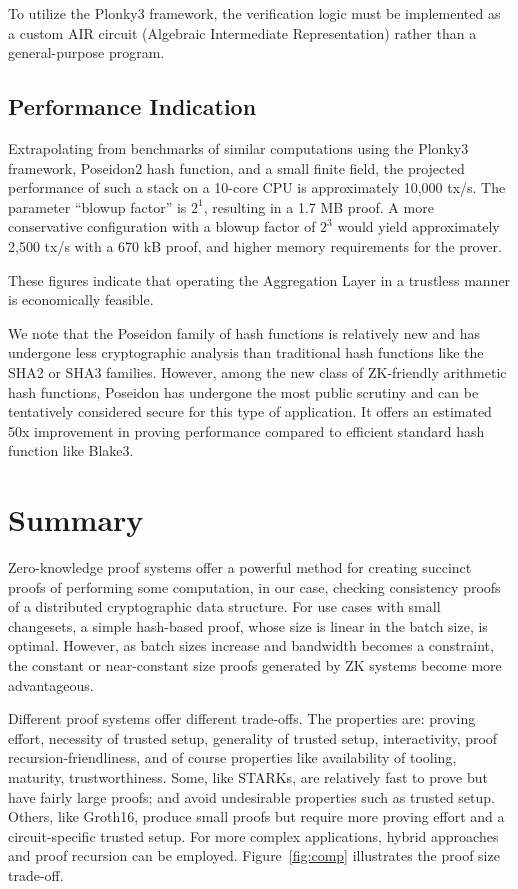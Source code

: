 \documentclass[twocolumn]{article}
\begin{document}
To utilize the Plonky3 framework, the verification logic must be implemented as a custom AIR circuit (Algebraic Intermediate Representation) rather than a general-purpose program.

\subsection{Performance Indication}

Extrapolating from benchmarks of similar computations using the Plonky3 framework, Poseidon2 hash function, and a small finite field, the projected performance of such a stack on a 10-core CPU is approximately 10,000 tx/s. The parameter ``blowup factor'' is $2^1$, resulting in a 1.7 MB proof. A more conservative configuration with a blowup factor of $2^3$ would yield approximately 2,500 tx/s with a 670 kB proof, and higher memory requirements for the prover.

These figures indicate that operating the Aggregation Layer in a trustless manner is economically feasible.

We note that the Poseidon family of hash functions is relatively new and has undergone less cryptographic analysis than traditional hash functions like the SHA2 or SHA3 families. However, among the new class of ZK-friendly arithmetic hash functions, Poseidon has undergone the most public scrutiny and can be tentatively considered secure for this type of application. It offers an estimated 50x improvement in proving performance compared to efficient standard hash function like Blake3.

\section{Summary}

Zero-knowledge proof systems offer a powerful method for creating succinct proofs of performing some computation, in our case, checking consistency proofs of a distributed cryptographic data structure. For use cases with small changesets, a simple hash-based proof, whose size is linear in the batch size, is optimal. However, as batch sizes increase and bandwidth becomes a constraint, the constant or near-constant size proofs generated by ZK systems become more advantageous.

Different proof systems offer different trade-offs. The properties are: proving effort, necessity of trusted setup, generality of trusted setup, interactivity, proof recursion-friendliness, and of course properties like availability of tooling, maturity, trustworthiness. Some, like STARKs, are relatively fast to prove but have fairly large proofs; and avoid undesirable properties such as trusted setup. Others, like Groth16, produce small proofs but require more proving effort and a circuit-specific trusted setup. For more complex applications, hybrid approaches and proof recursion can be employed. Figure~\ref{fig:comp} illustrates the proof size trade-off.
\end{document}
